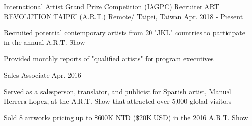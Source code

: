

\begin{cventries}
  \cventry
    {International Artist Grand Prize Competition (IAGPC) Recruiter} %
    {ART REVOLUTION TAIPEI (A.R.T.)} %
    {Remote/ Taipei, Taiwan} %
    {Apr. 2018 - Present} %
    {
      \begin{cvitems} %
        \item {Recruited potential contemporary artists from 20 "JKL" countries to participate in the annual A.R.T. Show}
        \item{Provided monthly reports of "qualified artists" for program executives}
      \end{cvitems}
    }






  \cventry
    {Sales Associate} %
    {} %
    {} %
    {Apr. 2016} %
    {
      \begin{cvitems} %
        \item {Served as a salesperson, translator, and publicist for Spanish artist, Manuel Herrera Lopez, \newline at the A.R.T. Show that attracted over 5,000 global visitors}
        \item{Sold 8 artworks pricing up to \$600K NTD (\$20K USD) in the 2016 A.R.T. Show}
      \end{cvitems}
    }

\end{cventries}
